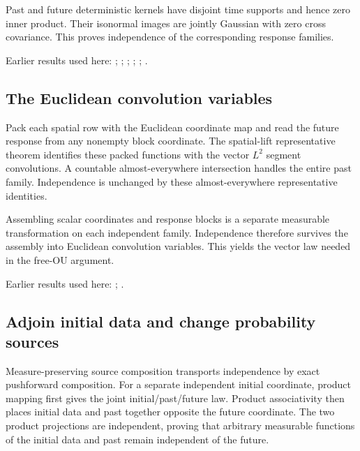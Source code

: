 \documentclass[11pt,a4paper]{report}
\begin{document}
Past and future deterministic kernels have disjoint time supports and hence zero inner product. Their isonormal images are jointly Gaussian with zero cross covariance. This proves independence of the corresponding response families.



Earlier results used here: \cite[Section~3.6.12]{LangevinLean2026ULASC}; \cite[Section~3.6.25]{LangevinLean2026ULASC}; \cite[Section~3.7.2]{LangevinLean2026ULASC}; \cite[Section~3.8.16]{LangevinLean2026ULASC}; \cite[Section~3.8.17]{LangevinLean2026ULASC}; \cite[Section~3.8.5]{LangevinLean2026ULASC}.
\subsection{\texorpdfstring{The Euclidean convolution variables}{The Euclidean convolution variables}}
\label{report-step-KineticLangevin-PastFutureIndependence-lean-3}


Pack each spatial row with the Euclidean coordinate map and read the future response from any nonempty block coordinate. The spatial-lift representative theorem identifies these packed functions with the vector \(L^{2}\) segment convolutions. A countable almost-everywhere intersection handles the entire past family. Independence is unchanged by these almost-everywhere representative identities.



Assembling scalar coordinates and response blocks is a separate measurable transformation on each independent family. Independence therefore survives the assembly into Euclidean convolution variables. This yields the vector law needed in the free-OU argument.



Earlier results used here: \cite[Section~3.8.16]{LangevinLean2026ULASC}; \cite[Section~3.8.17]{LangevinLean2026ULASC}.
\subsection{\texorpdfstring{Adjoin initial data and change probability sources}{Adjoin initial data and change probability sources}}
\label{report-step-KineticLangevin-PastFutureIndependence-lean-4}


Measure-preserving source composition transports independence by exact pushforward composition. For a separate independent initial coordinate, product mapping first gives the joint initial/\allowbreak{}past/\allowbreak{}future law. Product associativity then places initial data and past together opposite the future coordinate. The two product projections are independent, proving that arbitrary measurable functions of the initial data and past remain independent of the future.
\end{document}
